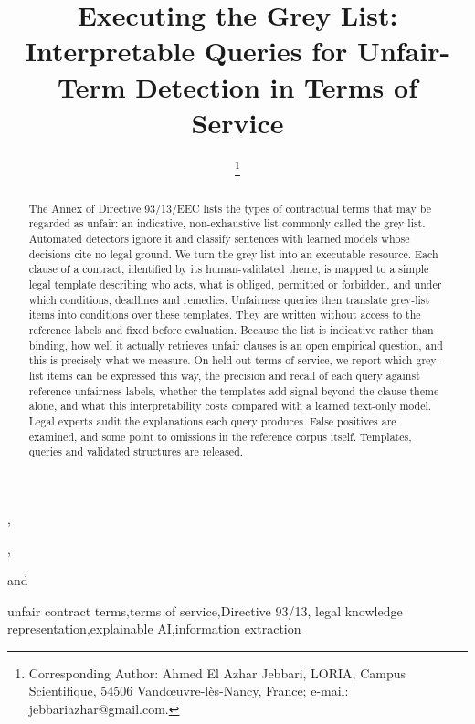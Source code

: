 \documentclass{IOS-Book-Article}
\begin{document}
\begin{frontmatter}
\title{Executing the Grey List: Interpretable Queries for Unfair-Term Detection in Terms of Service}
\author[A]{ %
\thanks{Corresponding Author: Ahmed El Azhar Jebbari, LORIA, Campus Scientifique, 54506 Vandœuvre-lès-Nancy, France; e-mail: jebbariazhar@gmail.com.}},
\author[A]{ },
\author[B]{ }
and
\author[C]{ }
\address[A]{LORIA, Université de Lorraine, CNRS, Inria, Nancy, France}
\address[B]{Juristiadata, France}
\address[C]{Faculty of Legal Sciences, Rabat, Morocco}

\begin{abstract}
The Annex of Directive 93/13/EEC lists the types of contractual terms that may be regarded as unfair: an indicative, non-exhaustive list commonly called the grey list. Automated detectors ignore it and classify sentences with learned models whose decisions cite no legal ground. We turn the grey list into an executable resource. Each clause of a contract, identified by its human-validated theme, is mapped to a simple legal template describing who acts, what is obliged, permitted or forbidden, and under which conditions, deadlines and remedies. Unfairness queries then translate grey-list items into conditions over these templates. They are written without access to the reference labels and fixed before evaluation. Because the list is indicative rather than binding, how well it actually retrieves unfair clauses is an open empirical question, and this is precisely what we measure. On held-out terms of service, we report which grey-list items can be expressed this way, the precision and recall of each query against reference unfairness labels, whether the templates add signal beyond the clause theme alone, and what this interpretability costs compared with a learned text-only model. Legal experts audit the explanations each query produces. False positives are examined, and some point to omissions in the reference corpus itself. Templates, queries and validated structures are released.
\end{abstract}

\begin{keyword}
unfair contract terms\sep terms of service\sep Directive 93/13\sep
legal knowledge representation\sep explainable AI\sep information extraction
\end{keyword}
\end{frontmatter}
\end{document}
